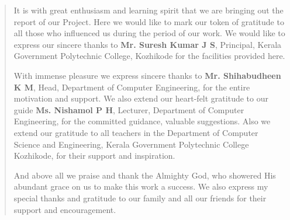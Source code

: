 \documentclass[12pt,a4paper,final]{extreport}
\begin{document}
\begin{quote}
{                                                 
	\hspace{01.5cm}It is with great enthusiasm and learning spirit that we are bringing out the report of our Project. Here we would like to mark our token of gratitude to all those who influenced us during the period of our work. We would like to express our sincere thanks to \textbf{Mr. Suresh Kumar J S}, Principal, Kerala Government Polytechnic College, Kozhikode for the facilities provided here.
\par
	
	\hspace{01.5cm}With immense pleasure we express sincere thanks to \textbf{Mr. Shihabudheen K M}, Head, Department of Computer Engineering, for the entire motivation and support. We also extend our heart-felt gratitude to our guide \textbf{Ms. Nishamol P H}, Lecturer, Department of Computer Engineering, for the committed guidance, valuable suggestions. Also we extend our gratitude to all teachers in the Department of Computer Science and Engineering, Kerala Government Polytechnic College Kozhikode, for their support and inspiration.
\par	
\hspace{01.5cm}And above all we praise and thank the Almighty God, who showered His abundant grace on us to make this work a success. We also express my special thanks and gratitude to our family and all our friends for their support and encouragement.
}
\end{quote}


\end{document}
